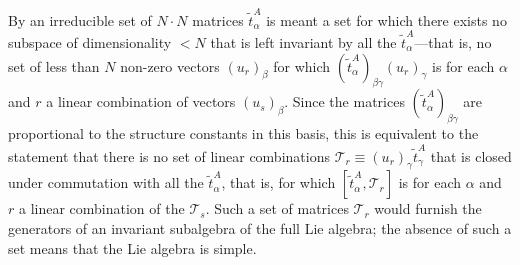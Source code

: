By an irreducible set of $N\cdot N$ matrices $\widetilde t^A_\alpha$ is meant a set for which there exists no subspace of dimensionality $<N$ that is left invariant by all the $\widetilde t^A_\alpha$---that is, no set of less than $N$ non-zero vectors $(u_r)_\beta$ for which $(\widetilde t^A_\alpha)_{\beta\gamma}(u_r)_\gamma$ is for each $\alpha$ and $r$ a linear combination of vectors $(u_s)_\beta$. Since the matrices $(\widetilde t^A_\alpha)_{\beta\gamma}$ are proportional to the structure constants in this basis, this is equivalent to the statement that there is no set of linear combinations $\mathcal T_r\equiv(u_r)_\gamma\widetilde t^A_\gamma$ that is closed under commutation with all the $\widetilde t^A_\alpha$, that is, for which $[\widetilde t^A_\alpha,\mathcal T_r]$ is for each $\alpha$ and $r$ a linear combination of the $\mathcal T_s$. Such a set of matrices $\mathcal T_r$ would furnish the generators of an invariant subalgebra of the full Lie algebra; the absence of such a set means that the Lie algebra is simple.

